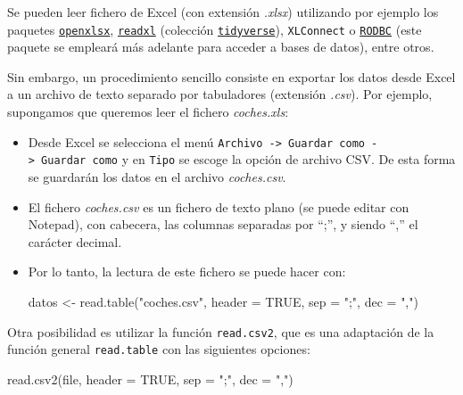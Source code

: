 \documentclass[
]{book}
\newenvironment{Shaded}{\begin{snugshade}}{\end{snugshade}}
\newcommand{\AttributeTok}[1]{\textcolor[rgb]{0.77,0.63,0.00}{#1}}
\newcommand{\ConstantTok}[1]{\textcolor[rgb]{0.00,0.00,0.00}{#1}}
\newcommand{\FunctionTok}[1]{\textcolor[rgb]{0.00,0.00,0.00}{#1}}
\newcommand{\NormalTok}[1]{#1}
\newcommand{\OtherTok}[1]{\textcolor[rgb]{0.56,0.35,0.01}{#1}}
\newcommand{\StringTok}[1]{\textcolor[rgb]{0.31,0.60,0.02}{#1}}
\theoremstyle{break}
\theoremstyle{nonumberplain}
\begin{document}
Se pueden leer fichero de
Excel (con extensión \emph{.xlsx}) utilizando por ejemplo los paquetes \href{https://cran.r-project.org/web/packages/openxlsx/index.html}{\texttt{openxlsx}}, \href{https://readxl.tidyverse.org}{\texttt{readxl}} (colección \href{https://www.tidyverse.org/}{\texttt{tidyverse}}), \texttt{XLConnect} o
\href{https://cran.r-project.org/web/packages/RODBC/index.html}{\texttt{RODBC}} (este paquete se empleará más adelante para acceder a bases de datos),
entre otros.

Sin embargo, un procedimiento sencillo consiste en exportar los datos desde Excel a un archivo
de texto separado por tabuladores (extensión \emph{.csv}).
Por ejemplo, supongamos que queremos leer el fichero \emph{coches.xls}:

\begin{itemize}
\item
  Desde Excel se selecciona el menú
  \texttt{Archivo\ -\textgreater{}\ Guardar\ como\ -\textgreater{}\ Guardar\ como} y en \texttt{Tipo} se escoge la opción de
  archivo CSV. De esta forma se guardarán los datos en el archivo
  \emph{coches.csv}.
\item
  El fichero \emph{coches.csv} es un fichero de texto plano (se puede
  editar con Notepad), con cabecera, las columnas separadas por ``;'', y
  siendo ``,'' el carácter decimal.
\item
  Por lo tanto, la lectura de este fichero se puede hacer con:

\begin{Shaded}
\begin{Highlighting}[]
\NormalTok{datos }\OtherTok{\textless{}{-}} \FunctionTok{read.table}\NormalTok{(}\StringTok{"coches.csv"}\NormalTok{, }\AttributeTok{header =} \ConstantTok{TRUE}\NormalTok{, }\AttributeTok{sep =} \StringTok{";"}\NormalTok{, }\AttributeTok{dec =} \StringTok{","}\NormalTok{)}
\end{Highlighting}
\end{Shaded}
\end{itemize}

Otra posibilidad es utilizar la función \texttt{read.csv2}, que es
una adaptación de la función general \texttt{read.table} con las siguientes
opciones:

\begin{Shaded}
\begin{Highlighting}[]
\FunctionTok{read.csv2}\NormalTok{(file, }\AttributeTok{header =} \ConstantTok{TRUE}\NormalTok{, }\AttributeTok{sep =} \StringTok{";"}\NormalTok{, }\AttributeTok{dec =} \StringTok{","}\NormalTok{)}
\end{Highlighting}
\end{Shaded}
\end{document}
